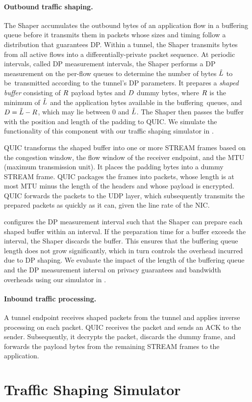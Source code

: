 \paragraph{Outbound traffic shaping.}
The Shaper accumulates the outbound bytes of an application flow in a buffering queue before it transmits them in packets whose sizes and timing follow a distribution that guarantees DP.
Within a tunnel, the Shaper transmits bytes from all active flows into a differentially-private packet sequence.
At periodic intervals, called DP measurement intervals, the Shaper performs a DP measurement on the per-flow queues to determine the number of bytes $\tilde{L}$ to be~transmitted according to the tunnel's DP parameters.
It prepares a {\em shaped buffer} consisting of $R$ payload bytes and $D$ dummy bytes, where $R$ is the minimum of $\tilde{L}$ and the application bytes available in the buffering~queues, and $D = \tilde{L} - R$, which may lie between 0 and $\tilde{L}$.
The Shaper then passes the buffer with the position and length of the padding to QUIC. We simulate the functionality of this component with our traffic shaping simulator in .

QUIC transforms the shaped buffer into one or more STREAM frames based on the
congestion window, the flow window of the receiver endpoint, and the MTU
(maximum transmission unit).
It places the padding bytes into a dummy STREAM frame.
QUIC packages the frames into packets, whose length is at most MTU minus the length of the headers and whose payload is encrypted.
QUIC forwards the packets to the UDP layer, which subsequently transmits the prepared packets as quickly as it can, given the line rate of the NIC.

{\sys} configures the DP measurement interval such that the Shaper can prepare each shaped buffer within an interval.
If the preparation time for a buffer exceeds the interval, the Shaper discards the buffer.
This ensures that the buffering queue length does not grow significantly, which in turn controls the overhead incurred due to DP shaping.
We evaluate the impact of the length of the buffering queue and the DP
measurement interval on privacy guarantees and bandwidth overheads using our simulator in .

\paragraph{Inbound traffic processing.}
A tunnel endpoint receives shaped packets from the tunnel and applies inverse
processing on each packet.
QUIC receives the packet and
sends an ACK to the sender. Subsequently, it decrypts the packet, discards the
dummy frame, and forwards the payload bytes from the remaining STREAM frames to
the application.

\section{Traffic Shaping Simulator}\label{sec:eval-simulator}

